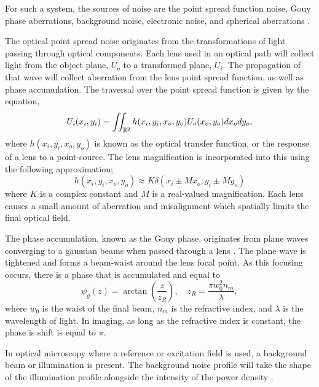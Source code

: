 For such a system, the sources of noise are the point spread function noise, Gouy phase aberrations, background noise, electronic noise, and spherical aberrations \cite{holst2007cmos, holographic2015aberration}. 

The optical point spread noise originates from the transformations of light passing through optical components. Each lens used in an optical path will collect light from the object plane, $U_o$ to a transformed plane, $U_i$. The propagation of that wave will collect aberration from the lens point spread function, as well as phase accumulation. The traversal over the point spread function is given by the equation,  
\begin{equation}
    U_i(x_i, y_i) = \iint_{\mathbb{R}^2} h(x_i, y_i, x_o, y_o) U_o(x_o, y_o) dx_o dy_o,
\end{equation} 
where $h(x_i, y_i, x_o, y_o)$ is known as the optical transfer function, or the response of a lens to a point-source. The lens magnification is incorporated into this using the following approximation;
\begin{equation}
    h(x_i, y_i, x_o, y_o) \approx K \delta(x_i \pm M x_o, y_i \pm M y_o)
\end{equation}
where $K$ is a complex constant and $M$ is a real-valued magnification. Each lens causes a small amount of aberration and misalignment which spatially limits the final optical field.

The phase accumulation, known as the Gouy phase, originates from plane waves converging to a gaussian beams when passed through a lens \cite{Steck2021}. The plane wave is tightened and forms a beam-waist around the lens focal point. As this focusing occurs, there is a phase that is accumulated and  equal to
\begin{equation}
    \psi_g(z) = \arctan\left(\frac{z}{z_R}\right), \quad z_R = \frac{\pi w_0^2 n_m}{\lambda},
\end{equation}
where $w_0$ is the waist of the final beam, $n_m$ is the refractive index, and $\lambda$ is the wavelength of light. In imaging, as long as the refractive index is constant, the phase is shift is equal to $\pi$. 

In optical microscopy where a reference or excitation field is used, a background beam or illumination is present. The background noise profile will take the shape of the illumination profile alongside the intensity of the power density \cite{dewitPreciseCharacterizationNanometerscale2023,taylor_interferometric_2018}. 


